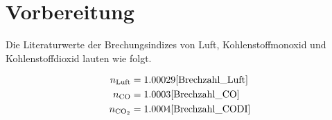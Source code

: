 \section{Vorbereitung}

Die Literaturwerte der Brechungsindizes von Luft, Kohlenstoffmonoxid und Kohlenstoffdioxid lauten wie folgt.

\begin{align}
    n_\text{Luft} &= 1.00029\text{\cite{Brechzahl_Luft}}\\ 
    n_\text{CO} &= 1.0003\text{\cite{Brechzahl_CO}}\\ 
    n_\text{CO$_2$} &= 1.0004\text{\cite{Brechzahl_CODI}}\\
\end{align}

